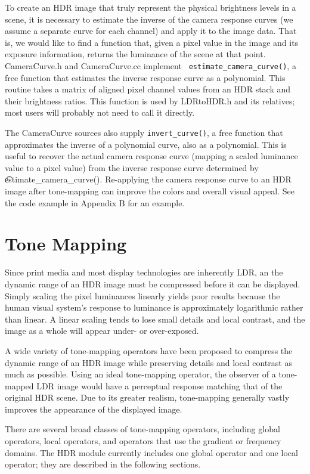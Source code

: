 To create an HDR image that truly represent the physical brightness
levels in a scene, it is necessary to estimate the inverse of the
camera response curves (we assume a separate curve for each channel)
and apply it to the image data.  That is, we would like to find a
function that, given a pixel value in the image and its exposure
information, returns the luminance of the scene at that point.
CameraCurve.h and CameraCurve.cc implement {\tt
  estimate\_camera\_curve()}, a free function that estimates the
inverse response curve as a polynomial.  This routine takes a matrix
of aligned pixel channel values from an HDR stack and their brightness
ratios. This function is used by LDRtoHDR.h and its relatives; most
users will probably not need to call it directly.

The CameraCurve sources also supply {\tt invert\_curve()}, a free
function that approximates the inverse of a polynomial curve, also as
a polynomial. This is useful to recover the actual camera response
curve (mapping a scaled luminance value to a pixel value) from the
inverse response curve determined by {\t
  estimate\_camera\_curve()}. Re-applying the camera response curve to
an HDR image after tone-mapping can improve the colors and overall
visual appeal. See the code example in Appendix B for an example.

\section{Tone Mapping}
\label{sec:tonemapping}
Since print media and most display technologies are inherently LDR,
an the dynamic range of an HDR image must be compressed before it
can be displayed. Simply scaling the pixel luminances linearly
yields poor results because the human visual system's response to
luminance is approximately logarithmic rather than linear. A linear
scaling tends to lose small details and local contrast, and the
image as a whole will appear under- or over-exposed.

A wide variety of tone-mapping operators have been proposed to
compress the dynamic range of an HDR image while preserving
details and local contrast as much as possible. Using an ideal
tone-mapping operator, the observer of a tone-mapped LDR image
would have a perceptual response matching that of the original
HDR scene. Due to its greater realism, tone-mapping generally
vastly improves the appearance of the displayed image.

There are several broad classes of tone-mapping operators, including
global operators, local operators, and operators that use the
gradient or frequency domains. The HDR module currently includes
one global operator and one local operator; they are described in
the following sections.

